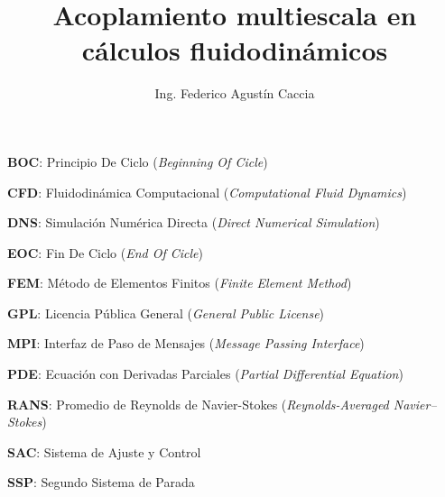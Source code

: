 \documentclass[12pt,screen,twoside,pagebackref]{ibtesis}
\title{Acoplamiento multiescala en cálculos fluidodinámicos}
\author{Ing. Federico Agustín Caccia}
\begin{document}
\renewcommand{\tablename}{Tabla} %


\begin{preliminary}



\begin{abreviaturas} %

\textbf{BOC}: Principio De Ciclo (\textit{Beginning Of Cicle})

\textbf{CFD}: Fluidodinámica Computacional (\textit{Computational Fluid Dynamics})

\textbf{DNS}: Simulación Numérica Directa (\textit{Direct Numerical Simulation})

\textbf{EOC}: Fin De Ciclo (\textit{End Of Cicle})

\textbf{FEM}: Método de Elementos Finitos (\textit{Finite Element Method})

\textbf{GPL}: Licencia Pública General (\textit{General Public License})



\textbf{MPI}: Interfaz de Paso de Mensajes (\textit{Message Passing Interface})

\textbf{PDE}: Ecuación con Derivadas Parciales (\textit{Partial Differential Equation})

\textbf{RANS}: Promedio de Reynolds de Navier-Stokes (\textit{Reynolds-Averaged Navier–Stokes})

\textbf{SAC}: Sistema de Ajuste y Control



\textbf{SSP}: Segundo Sistema de Parada

\end{abreviaturas}

\tableofcontents                %

\listoffigures                  %

\listoftables                   %



\end{preliminary}
\end{document}
